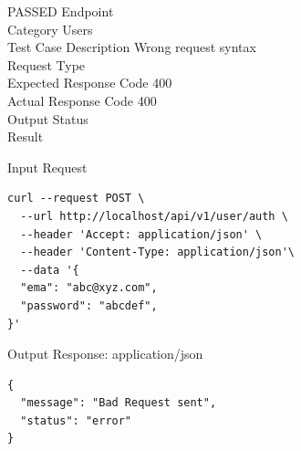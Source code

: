 \begin{testcase}{49}{PASSED}
Endpoint \hfill {}\\
Category \hfill Users\\
Test Case Description \hfill Wrong request syntax\\

Request Type    \hfill {}\\
Expected Response Code    \hfill 400\\
Actual Response Code    \hfill 400\\

Output Status \hfill {}\\
Result \hfill {}

\begin{ipblock}{Input Request}
\begin{verbatim}
curl --request POST \
  --url http://localhost/api/v1/user/auth \
  --header 'Accept: application/json' \
  --header 'Content-Type: application/json'\
  --data '{
  "ema": "abc@xyz.com",
  "password": "abcdef",
}'
\end{verbatim}
\end{ipblock}

\begin{opblock}{Output Response: application/json}
\begin{verbatim}
{
  "message": "Bad Request sent",
  "status": "error"
}
\end{verbatim}
\end{opblock}
\end{testcase}

